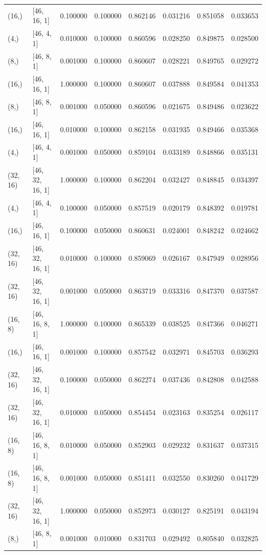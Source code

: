 \begin{tabular}{llrrrrrr}
(16,) & [46, 16, 1] & 0.100000 & 0.100000 & 0.862146 & 0.031216 & 0.851058 & 0.033653 \\
(4,) & [46, 4, 1] & 0.010000 & 0.100000 & 0.860596 & 0.028250 & 0.849875 & 0.028500 \\
(8,) & [46, 8, 1] & 0.001000 & 0.100000 & 0.860607 & 0.028221 & 0.849765 & 0.029272 \\
(16,) & [46, 16, 1] & 1.000000 & 0.100000 & 0.860607 & 0.037888 & 0.849584 & 0.041353 \\
(8,) & [46, 8, 1] & 0.001000 & 0.050000 & 0.860596 & 0.021675 & 0.849486 & 0.023622 \\
(16,) & [46, 16, 1] & 0.010000 & 0.100000 & 0.862158 & 0.031935 & 0.849466 & 0.035368 \\
(4,) & [46, 4, 1] & 0.001000 & 0.050000 & 0.859104 & 0.033189 & 0.848866 & 0.035131 \\
(32, 16) & [46, 32, 16, 1] & 1.000000 & 0.100000 & 0.862204 & 0.032427 & 0.848845 & 0.034397 \\
(4,) & [46, 4, 1] & 0.100000 & 0.050000 & 0.857519 & 0.020179 & 0.848392 & 0.019781 \\
(16,) & [46, 16, 1] & 0.100000 & 0.050000 & 0.860631 & 0.024001 & 0.848242 & 0.024662 \\
(32, 16) & [46, 32, 16, 1] & 0.010000 & 0.100000 & 0.859069 & 0.026167 & 0.847949 & 0.028956 \\
(32, 16) & [46, 32, 16, 1] & 0.001000 & 0.050000 & 0.863719 & 0.033316 & 0.847370 & 0.037587 \\
(16, 8) & [46, 16, 8, 1] & 1.000000 & 0.100000 & 0.865339 & 0.038525 & 0.847366 & 0.046271 \\
(16,) & [46, 16, 1] & 0.001000 & 0.100000 & 0.857542 & 0.032971 & 0.845703 & 0.036293 \\
(32, 16) & [46, 32, 16, 1] & 0.100000 & 0.050000 & 0.862274 & 0.037436 & 0.842808 & 0.042588 \\
(32, 16) & [46, 32, 16, 1] & 0.010000 & 0.050000 & 0.854454 & 0.023163 & 0.835254 & 0.026117 \\
(16, 8) & [46, 16, 8, 1] & 0.010000 & 0.050000 & 0.852903 & 0.029232 & 0.831637 & 0.037315 \\
(16, 8) & [46, 16, 8, 1] & 0.001000 & 0.050000 & 0.851411 & 0.032550 & 0.830260 & 0.041729 \\
(32, 16) & [46, 32, 16, 1] & 1.000000 & 0.050000 & 0.852973 & 0.030127 & 0.825191 & 0.043194 \\
(8,) & [46, 8, 1] & 0.001000 & 0.010000 & 0.831703 & 0.029492 & 0.805840 & 0.032825 \\

\end{tabular}
